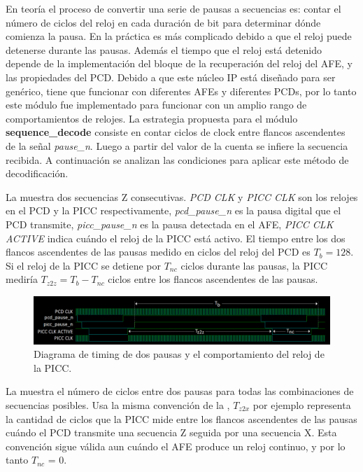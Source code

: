 \documentclass[a4paper, twoside, 11pt]{report}
\begin{document}
En teoría el proceso de convertir una serie de pausas a secuencias es: contar el número de ciclos del reloj en cada duración de bit para determinar dónde comienza la pausa. En la práctica es más complicado debido a que el reloj puede detenerse durante las pausas. Además el tiempo que el reloj está detenido depende de la implementación del bloque de la recuperación del reloj del AFE, y las propiedades del PCD. Debido a que este núcleo IP está diseñado para ser genérico, tiene que funcionar con diferentes AFEs y diferentes PCDs, por lo tanto este módulo fue implementado para funcionar con un amplio rango de comportamientos de relojes. La estrategia propuesta para el módulo \textbf{sequence\_decode} consiste en contar ciclos de clock entre flancos ascendentes de la señal \textit{pause\_n}. Luego a partir del valor de la cuenta se infiere la secuencia recibida. A continuación se analizan las condiciones para aplicar este método de decodificación.

La  muestra dos secuencias Z consecutivas. \textit{PCD CLK} y \textit{PICC CLK} son los relojes en el PCD y la PICC respectivamente, \textit{pcd\_pause\_n} es la pausa digital que el PCD transmite, \textit{picc\_pause\_n} es la pausa detectada en el AFE, \textit{PICC CLK ACTIVE} indica cuándo el reloj de la PICC está activo. El tiempo entre los dos flancos ascendentes de las pausas medido en ciclos del reloj del PCD es $T_b = 128$. Si el reloj de la PICC se detiene por $T_{nc}$ ciclos durante las pausas, la PICC mediría $T_{z2z} = T_b - T_{nc}$ ciclos entre los flancos ascendentes de las pausas.

\begin{figure}[htb]
  \centering
  \includegraphics[width=1.0\textwidth]{./img/rx_timings_tz2z}
  \caption{Diagrama de timing de dos pausas y el comportamiento del reloj de la PICC.}
  \label{fig:rx_timings_tz2z}
\end{figure}

La  muestra el número de ciclos entre dos pausas para todas las combinaciones de secuencias posibles. Usa la misma convención de la , $T_{z2x}$ por ejemplo representa la cantidad de ciclos que la PICC mide entre los flancos ascendentes de las pausas cuándo el PCD transmite una secuencia Z seguida por una secuencia X. Esta convención sigue válida aun cuándo el AFE produce un reloj continuo, y por lo tanto $T_{nc}$ = 0.
\end{document}
